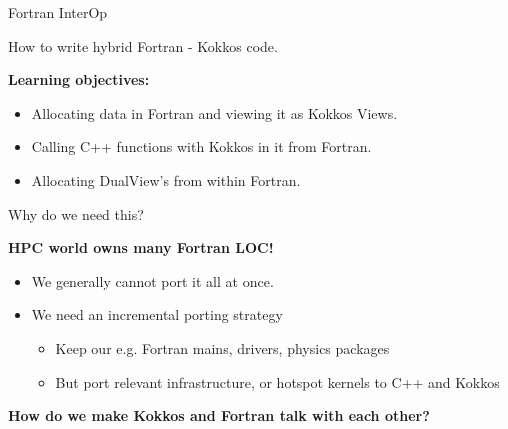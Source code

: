 
\begin{frame}[fragile]

  {\Huge Fortran InterOp}

  \vspace{10pt}

  {\large How to write hybrid Fortran - Kokkos code.}

  \vspace{20pt}

  \textbf{Learning objectives:}
  \begin{itemize}
    \item {Allocating data in Fortran and viewing it as Kokkos Views.}
    \item {Calling C++ functions with Kokkos in it from Fortran.}
    \item {Allocating DualView's from within Fortran.}
  \end{itemize}

  \vspace{-20pt}

\end{frame}


\begin{frame}[fragile]{Why do we need this?}

\textbf{HPC world owns many Fortran LOC!}

\vspace{10pt}
\begin{itemize}
  \item We generally cannot port it all at once.
  \item We need an incremental porting strategy
  \begin{itemize}
    \item Keep our e.g. Fortran mains, drivers, physics packages
    \item But port relevant infrastructure, or hotspot kernels to C++ and Kokkos
  \end{itemize}
\end{itemize}

\vspace{10pt}
\pause
\textbf{How do we make Kokkos and Fortran talk with each other?}
\end{frame}

